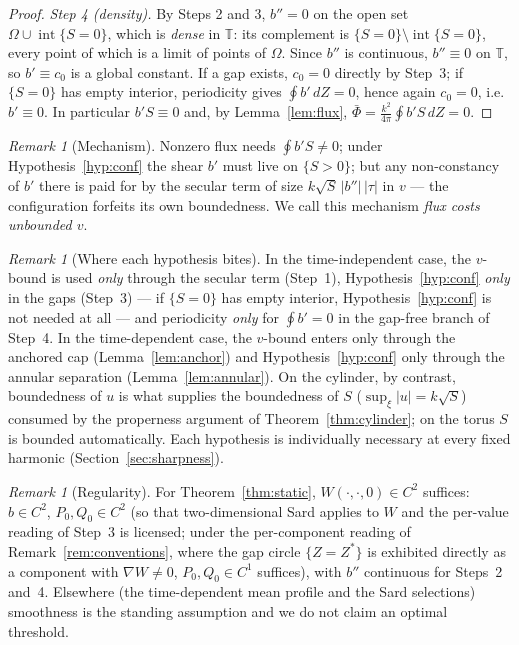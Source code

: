 \documentclass[11pt]{amsart}
\theoremstyle{definition}
\theoremstyle{remark}
\newtheorem{remark}[theorem]{Remark}
\newcommand{\T}{\mathbb{T}}
\newcommand{\Fbar}{\bar\Phi}
\DeclareMathOperator{\intr}{int}
\begin{document}
\begin{proof}
\emph{Step 4 (density).} By Steps 2 and 3, $b''=0$ on the open set
$\Omega\cup\intr\{S=0\}$, which is \emph{dense} in $\T$: its complement
is $\{S=0\}\setminus\intr\{S=0\}$, every point of which is a limit of
points of $\Omega$. Since $b''$ is continuous, $b''\equiv0$ on $\T$, so
$b'\equiv c_0$ is a global constant. If a gap exists, $c_0=0$ directly
by Step~3; if $\{S=0\}$ has empty interior, periodicity gives
$\oint b'\,dZ=0$, hence again $c_0=0$, i.e.\ $b'\equiv0$. In
particular $b'S\equiv0$ and, by Lemma~\ref{lem:flux},
$\Fbar=\frac{k^2}{4\pi}\oint b'S\,dZ=0$.
\end{proof}

\begin{remark}[Mechanism]\label{rem:mechanism}
Nonzero flux needs $\oint b'S\neq0$; under Hypothesis~\ref{hyp:conf}
the shear $b'$ must live on $\{S>0\}$; but any non-constancy of $b'$
there is paid for by the secular term of size
$k\sqrt S\,|b''|\,|\tau|$ in $v$ --- the configuration forfeits its own
boundedness. We call this mechanism \emph{flux costs unbounded $v$}.
\end{remark}

\begin{remark}[Where each hypothesis bites]\label{rem:bites}
In the time-independent case, the $v$-bound is used \emph{only} through
the secular term (Step~1), Hypothesis~\ref{hyp:conf} \emph{only} in the
gaps (Step~3) --- if $\{S=0\}$ has empty interior,
Hypothesis~\ref{hyp:conf} is not needed at all --- and periodicity
\emph{only} for $\oint b'=0$ in the gap-free branch of Step~4. In the
time-dependent case, the $v$-bound enters only through the anchored cap
(Lemma~\ref{lem:anchor}) and Hypothesis~\ref{hyp:conf} only through the
annular separation (Lemma~\ref{lem:annular}). On the cylinder, by
contrast, boundedness of $u$ is what supplies the boundedness of $S$
($\sup_\xi|u|=k\sqrt S$) consumed by the properness argument of
Theorem~\ref{thm:cylinder}; on the torus $S$ is bounded automatically.
Each hypothesis is individually necessary at every fixed harmonic
(Section~\ref{sec:sharpness}).
\end{remark}

\begin{remark}[Regularity]\label{rem:regularity}
For Theorem~\ref{thm:static}, $W(\cdot,\cdot,0)\in C^2$ suffices:
$b\in C^2$, $P_0,Q_0\in C^2$ (so that two-dimensional Sard applies to
$W$ and the per-value reading of Step~3 is licensed; under the
per-component reading of Remark~\ref{rem:conventions}, where the gap
circle $\{Z=Z^*\}$ is exhibited directly as a component with
$\nabla W\neq0$, $P_0,Q_0\in C^1$ suffices), with $b''$ continuous for
Steps~2 and~4. Elsewhere (the time-dependent mean profile and the Sard
selections) smoothness is the standing assumption and we do not claim
an optimal threshold.
\end{remark}
\end{document}
